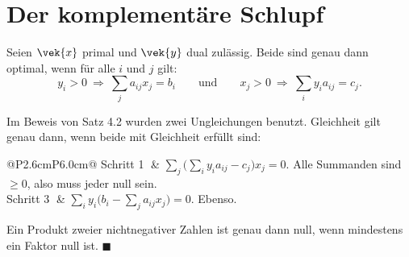 \section{Der komplementäre Schlupf}

\begin{merksatz}
Seien $\vek{x}$ primal und $\vek{y}$ dual zulässig. Beide sind genau dann optimal, wenn für alle $i$ und $j$ gilt:
\[ y_i > 0 \ \Longrightarrow\ \sum_j a_{ij}x_j = b_i \qquad\text{und}\qquad x_j > 0 \ \Longrightarrow\ \sum_i y_ia_{ij} = c_j . \]

Im Beweis von Satz 4.2 wurden zwei Ungleichungen benutzt. Gleichheit gilt genau dann, wenn beide mit Gleichheit erfüllt sind:
\begin{center}
{\small
\renewcommand{\arraystretch}{1.5}
\begin{tabular}{@{}P{2.6cm}P{6.0cm}@{}}
\toprule
Schritt \textcircled{1} & $\sum_j\bigl(\sum_i y_ia_{ij}-c_j\bigr)x_j = 0$. Alle Summanden sind $\ge 0$, also muss jeder null sein.\\
Schritt \textcircled{3} & $\sum_i y_i\bigl(b_i-\sum_j a_{ij}x_j\bigr) = 0$. Ebenso.\\
\bottomrule
\end{tabular}}
\end{center}

Ein Produkt zweier nichtnegativer Zahlen ist genau dann null, wenn mindestens ein Faktor null ist. $\blacksquare$
\end{merksatz}

